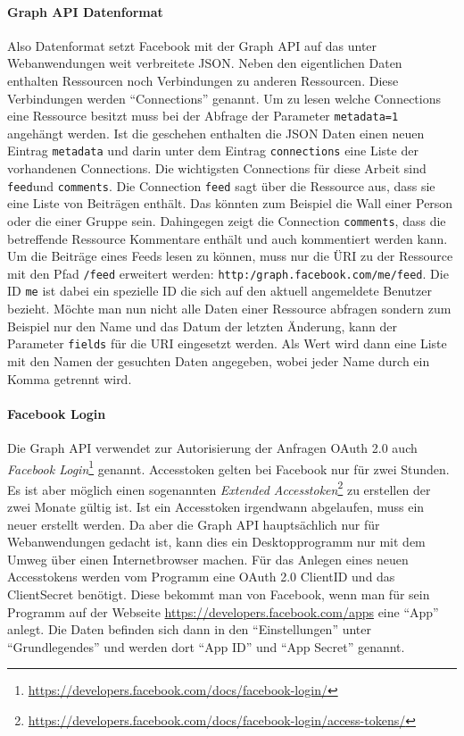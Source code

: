 \paragraph{Graph API Datenformat} %
\label{par:graph_api_datenformat}

Also Datenformat setzt Facebook mit der Graph API auf das unter Webanwendungen weit verbreitete JSON. Neben den eigentlichen Daten enthalten Ressourcen noch Verbindungen zu anderen Ressourcen. Diese Verbindungen werden \enquote{Connections} genannt. Um zu lesen welche Connections eine Ressource besitzt muss bei der Abfrage der Parameter \texttt{metadata=1} angehängt werden. Ist die geschehen enthalten die JSON Daten einen neuen Eintrag \texttt{metadata} und darin unter dem Eintrag \texttt{connections} eine Liste der vorhandenen Connections. Die wichtigsten Connections für diese Arbeit sind \texttt{feed}und \texttt{comments}. Die Connection \texttt{feed} sagt über die Ressource aus, dass sie eine Liste von Beiträgen enthält. Das könnten zum Beispiel die Wall einer Person oder die einer Gruppe sein. Dahingegen zeigt die Connection \texttt{comments}, dass die betreffende Ressource Kommentare enthält und auch kommentiert werden kann. Um die Beiträge eines Feeds lesen zu können, muss nur die ÜRI zu der Ressource mit den Pfad \texttt{/feed} erweitert werden: \texttt{http:/graph.facebook.com/me/feed}. Die ID \texttt{me} ist dabei ein spezielle ID die sich auf den aktuell angemeldete Benutzer bezieht. Möchte man nun nicht alle Daten einer Ressource abfragen sondern zum Beispiel nur den Name und das Datum der letzten Änderung, kann der Parameter \texttt{fields} für die URI eingesetzt werden. Als Wert wird dann eine Liste mit den Namen der gesuchten Daten angegeben, wobei jeder Name durch ein Komma getrennt wird. 


\paragraph{Facebook Login} %
\label{par:facebook_login}

Die Graph API verwendet zur Autorisierung der Anfragen OAuth 2.0 auch \emph{Facebook Login}\footnote{\url{https://developers.facebook.com/docs/facebook-login/}} genannt. Accesstoken gelten bei Facebook nur für zwei Stunden. Es ist aber möglich einen sogenannten \emph{Extended Accesstoken}\footnote{\url{https://developers.facebook.com/docs/facebook-login/access-tokens/}} zu erstellen der zwei Monate gültig ist. Ist ein Accesstoken irgendwann abgelaufen, muss ein neuer erstellt werden. Da aber die Graph API hauptsächlich nur für Webanwendungen gedacht ist, kann dies ein Desktopprogramm nur mit dem Umweg über einen Internetbrowser machen. Für das Anlegen eines neuen Accesstokens werden vom Programm eine OAuth 2.0 ClientID und das ClientSecret benötigt. Diese bekommt man von Facebook, wenn man für sein Programm auf der Webseite \url{https://developers.facebook.com/apps} eine \enquote{App} anlegt. Die Daten befinden sich dann in den \enquote{Einstellungen} unter \enquote{Grundlegendes} und werden dort \enquote{App ID} und \enquote{App Secret} genannt.

